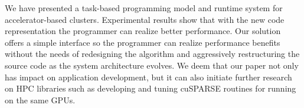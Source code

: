 We have presented a task-based programming model and runtime system for accelerator-based clusters.
Experimental results show that with the new code representation the programmer can realize better performance.
Our solution offers a simple interface so the programmer can realize performance benefits without the needs of redesigning the algorithm and aggressively restructuring the source code as the system architecture evolves.
We deem that our paper not only has impact on application development, but it can also initiate further research on HPC libraries such as developing and tuning cuSPARSE routines for running on the same GPUs. 
